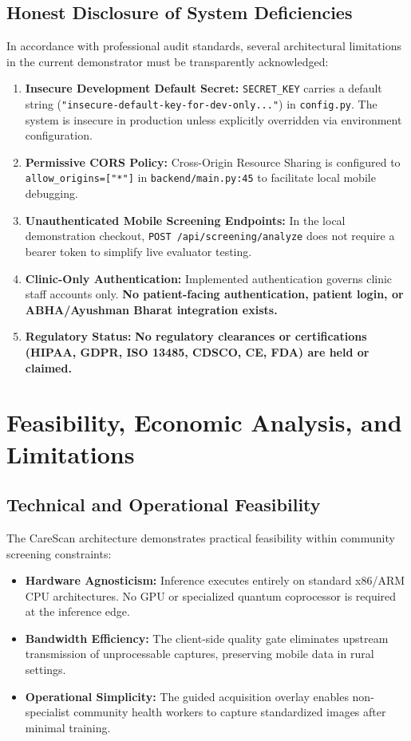 \documentclass[11pt,a4paper]{report}
\newcommand{\artifact}[1]{\texttt{\footnotesize #1}}
\begin{document}
\section{Honest Disclosure of System Deficiencies}
In accordance with professional audit standards, several architectural limitations in the current demonstrator must be transparently acknowledged:
\begin{enumerate}
  \item \textbf{Insecure Development Default Secret:} \texttt{SECRET\_KEY} carries a default string (\texttt{"insecure-default-key-for-dev-only..."}) in \artifact{config.py}. The system is insecure in production unless explicitly overridden via environment configuration.
  \item \textbf{Permissive CORS Policy:} Cross-Origin Resource Sharing is configured to \texttt{allow\_origins=["*"]} in \artifact{backend/main.py:45} to facilitate local mobile debugging.
  \item \textbf{Unauthenticated Mobile Screening Endpoints:} In the local demonstration checkout, \texttt{POST /api/screening/analyze} does not require a bearer token to simplify live evaluator testing.
  \item \textbf{Clinic-Only Authentication:} Implemented authentication governs clinic staff accounts only. \textbf{No patient-facing authentication, patient login, or ABHA/Ayushman Bharat integration exists.}
  \item \textbf{Regulatory Status:} \textbf{No regulatory clearances or certifications (HIPAA, GDPR, ISO 13485, CDSCO, CE, FDA) are held or claimed.}
\end{enumerate}

\chapter{Feasibility, Economic Analysis, and Limitations}

\section{Technical and Operational Feasibility}
The CareScan architecture demonstrates practical feasibility within community screening constraints:
\begin{itemize}
  \item \textbf{Hardware Agnosticism:} Inference executes entirely on standard x86/ARM CPU architectures. No GPU or specialized quantum coprocessor is required at the inference edge.
  \item \textbf{Bandwidth Efficiency:} The client-side quality gate eliminates upstream transmission of unprocessable captures, preserving mobile data in rural settings.
  \item \textbf{Operational Simplicity:} The guided acquisition overlay enables non-specialist community health workers to capture standardized images after minimal training.
\end{itemize}
\end{document}
